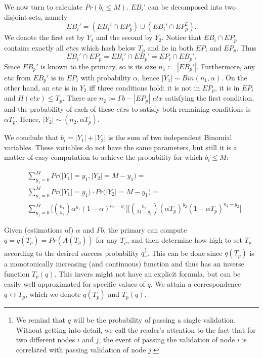 We now turn to calculate $Pr(b_i\leq M)$. $EB_i'$ can be decomposed into two disjoint sets, namely 
$$EB_i'=(EB_i'\cap EP_p)\cup (EB_i'\cap EP_p^\complement).$$ We denote the first set by $Y_1$ and the second by $Y_2$. Notice that $EB_i\cap EP_p$ contains exactly all $etx$s which hash below $T_p$ and lie in both $EP_i$ and $EP_p$. Thus  
$$EB_i'\cap EP_p=EB_i'\cap EB_p'=EP_i\cap EB_p'.$$ Since $EB_p'$ is known to the primary, so is its size $n_1:=|EB_p'|$. Furthermore, any $etx$ from $EB_p'$ is in $EP_i$ with probability $\alpha$, hence $|Y_1|\sim Bin(n_1,\alpha)$. On the other hand, an  $etx$ is in $Y_2$ iff three conditions hold: it is not in $EP_p$, it is in $EP_i$ and $H(etx)\leq T_p$. There are $n_2:=\Gamma b-|EP_p|$ $etx$ satisfying the first condition, and the probability of each of these $etx$s to satisfy both remaining conditions is $\alpha T_p$. Hence, $|Y_2|\sim (n_2,\alpha T_p)$. 

We conclude that $b_i=|Y_1|+|Y_2|$ is the sum of two independent Binomial variables. These variables do not have the same parameters, but still it is a matter of easy computation to achieve the probability for which $b_i\leq M$:

\begingroup\makeatletter{}\check@mathfonts
\begin{align*}
	& \sum_{y_1=0}^M Pr\big(|Y_1| = y_1,|Y_2|=M-y_1\big) = \\
    & \sum_{y_1=0}^M Pr\big(|Y_1|=y_1)\cdot Pr(|Y_2|=M-y_1\big) =\\
    & \sum_{y_1=0}^M \bigg[{{n_1}\choose{y_1}}\alpha^{y_1}(1-\alpha)^{n_1-y_1}\bigg]\bigg[{{n_2}\choose{M-y_1}}(\alpha T_p)^{y_2}(1-\alpha T_p)^{n_2-y_2}\bigg]
\end{align*} \endgroup

Given (estimations of) $\alpha$ and $\Gamma b$, the primary can compute $q=q(T_p)=Pr\left(A\left(T_p\right)\right)$ for any $T_p$, and then determine how high to set $T_p$ according to the desired success probability $q$\footnote{We remind that $q$ will be the probability of passing a single validation. Without getting into detail, we call the reader's attention to the fact that for two different nodes $i$ and $j$, the event of passing the validation of node $i$ is correlated with passing validation of node $j$.}. This can be done since $q(T_p)$ is a monotonically increasing (and continuous) function and thus has an inverse function $T_p(q)$. This invers might not have an explicit formula, but can be easily well approximated for specific values of $q$. We attain a correspondence $q\leftrightarrow T_p$, which we denote $q(T_p)$ and $T_p(q)$.

